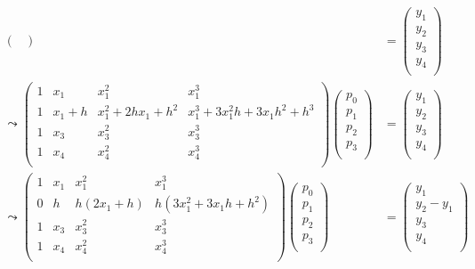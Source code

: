 \documentclass[english,11pt,a4paper]{article}
\begin{document}
\begin{align*}
\begin{pmatrix}
  \end{pmatrix}
  &=
  \begin{pmatrix}
  y_1 \\
  y_2 \\
  y_3 \\
  y_4 \\
  \end{pmatrix}
  \\
  \leadsto
  \begin{pmatrix}
  1 & x_1 & x_1^2 & x_1^3\\
  1 & x_1+h & x_1^2 + 2hx_1 + h^2 & x_1^3+3x_1^2h+3x_1h^2+h^3\\
  1 & x_3 & x_3^2 & x_3^3\\
  1 & x_4 & x_4^2 & x_4^3\\
  \end{pmatrix}
  \begin{pmatrix}
  p_0 \\
  p_1 \\
  p_2 \\
  p_3 \\
  \end{pmatrix}
  &=
  \begin{pmatrix}
  y_1 \\
  y_2 \\
  y_3 \\
  y_4 \\
  \end{pmatrix}
  \\
  \leadsto
  \begin{pmatrix}
  1 & x_1 & x_1^2 & x_1^3\\
  0 & h & h(2x_1 + h) & h(3x_1^2+3x_1h+h^2)\\
  1 & x_3 & x_3^2 & x_3^3\\
  1 & x_4 & x_4^2 & x_4^3\\
  \end{pmatrix}
  \begin{pmatrix}
  p_0 \\
  p_1 \\
  p_2 \\
  p_3 \\
  \end{pmatrix}
  &=
  \begin{pmatrix}
  y_1 \\
  y_2-y_1 \\
  y_3 \\
  y_4 \\
  \end{pmatrix}
  \\

\end{align*}
\end{document}
